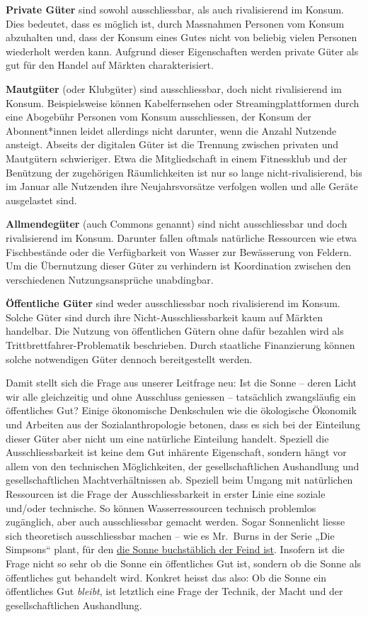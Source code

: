 \documentclass[
  nswissgerman,
  a4paper,
  DIV=11,
  numbers=noendperiod,
  oneside,
  openany]{scrreprt}
\begin{document}
\textbf{Private Güter} sind sowohl ausschliessbar, als auch
rivalisierend im Konsum. Dies bedeutet, dass es möglich ist, durch
Massnahmen Personen vom Konsum abzuhalten und, dass der Konsum eines
Gutes nicht von beliebig vielen Personen wiederholt werden kann.
Aufgrund dieser Eigenschaften werden private Güter als gut für den
Handel auf Märkten charakterisiert.

\textbf{Mautgüter} (oder Klubgüter) sind ausschliessbar, doch nicht
rivalisierend im Konsum. Beispielsweise können Kabelfernsehen oder
Streamingplattformen durch eine Abogebühr Personen vom Konsum
ausschliessen, der Konsum der Abonnent*innen leidet allerdings nicht
darunter, wenn die Anzahl Nutzende ansteigt. Abseits der digitalen Güter
ist die Trennung zwischen privaten und Mautgütern schwieriger. Etwa die
Mitgliedschaft in einem Fitnessklub und der Benützung der zugehörigen
Räumlichkeiten ist nur so lange nicht-rivalisierend, bis im Januar alle
Nutzenden ihre Neujahrsvorsätze verfolgen wollen und alle Geräte
ausgelastet sind.

\textbf{Allmendegüter} (auch Commons genannt) sind nicht ausschliessbar
und doch rivalisierend im Konsum. Darunter fallen oftmals natürliche
Ressourcen wie etwa Fischbestände oder die Verfügbarkeit von Wasser zur
Bewässerung von Feldern. Um die Übernutzung dieser Güter zu verhindern
ist Koordination zwischen den verschiedenen Nutzungsansprüche
unabdingbar.

\textbf{Öffentliche Güter} sind weder ausschliessbar noch rivalisierend
im Konsum. Solche Güter sind durch ihre Nicht-Ausschliessbarkeit kaum
auf Märkten handelbar. Die Nutzung von öffentlichen Gütern ohne dafür
bezahlen wird als Trittbrettfahrer-Problematik beschrieben. Durch
staatliche Finanzierung können solche notwendigen Güter dennoch
bereitgestellt werden.

Damit stellt sich die Frage aus unserer Leitfrage neu: Ist die Sonne --
deren Licht wir alle gleichzeitig und ohne Ausschluss geniessen --
tatsächlich zwangsläufig ein öffentliches Gut? Einige ökonomische
Denkschulen wie die ökologische Ökonomik und Arbeiten aus der
Sozialanthropologie betonen, dass es sich bei der Einteilung dieser
Güter aber nicht um eine natürliche Einteilung handelt. Speziell die
Ausschliessbarkeit ist keine dem Gut inhärente Eigenschaft, sondern
hängt vor allem von den technischen Möglichkeiten, der
gesellschaftlichen Aushandlung und gesellschaftlichen Machtverhältnissen
ab. Speziell beim Umgang mit natürlichen Ressourcen ist die Frage der
Ausschliessbarkeit in erster Linie eine soziale und/oder technische. So
können Wasserressourcen technisch problemlos zugänglich, aber auch
ausschliessbar gemacht werden. Sogar Sonnenlicht liesse sich theoretisch
ausschliessbar machen -- wie es Mr.~Burns in der Serie „Die Simpsons``
plant, für den \href{https://www.youtube.com/watch?v=L3LbxDZRgA4}{die
Sonne buchstäblich der Feind ist}. Insofern ist die Frage nicht so sehr
ob die Sonne ein öffentliches Gut ist, sondern ob die Sonne als
öffentliches gut behandelt wird. Konkret heisst das also: Ob die Sonne
ein öffentliches Gut \emph{bleibt}, ist letztlich eine Frage der
Technik, der Macht und der gesellschaftlichen Aushandlung.
\end{document}
